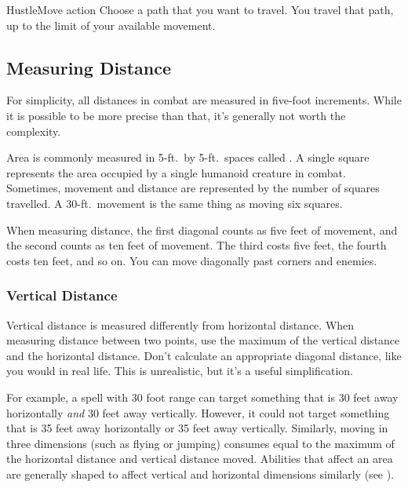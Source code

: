     \begin{activeability}{Hustle}{Move action}
      \rankline
      Choose a path that you want to travel.
      You travel that path, up to the limit of your available movement.
    \end{activeability}

  \subsection{Measuring Distance}

    For simplicity, all distances in combat are measured in five-foot increments.
    While it is possible to be more precise than that, it's generally not worth the complexity.

     Area is commonly measured in 5-ft.\ by 5-ft.\ spaces called .
    A single square represents the area occupied by a single humanoid creature in combat.
    Sometimes, movement and distance are represented by the number of squares travelled.
    A 30-ft.\ movement is the same thing as moving six squares.

     When measuring distance, the first diagonal counts as five feet of movement, and the second counts as ten feet of movement.
    The third costs five feet, the fourth costs ten feet, and so on.
    You can move diagonally past corners and enemies.

    \subsubsection{Vertical Distance}
      Vertical distance is measured differently from horizontal distance.
      When measuring distance between two points, use the maximum of the vertical distance and the horizontal distance.
      Don't calculate an appropriate diagonal distance, like you would in real life.
      This is unrealistic, but it's a useful simplification.

      For example, a spell with 30 foot range can target something that is 30 feet away horizontally \textit{and} 30 feet away vertically.
      However, it could not target something that is 35 feet away horizontally or 35 feet away vertically.
      Similarly, moving in three dimensions (such as flying or jumping) consumes  equal to the maximum of the horizontal distance and vertical distance moved.
      Abilities that affect an area are generally shaped to affect vertical and horizontal dimensions similarly (see ).

